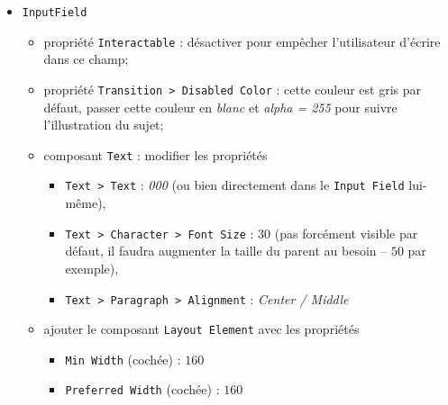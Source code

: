 \documentclass[a4paper,10pt]{article}
\newenvironment{solution}%
{\begin{tcolorbox}[breakable,colback=red!5!white,colframe=red!75!black,title=Solution]}%
{\end{tcolorbox}}
\begin{document}
\begin{solution}
\begin{itemize}
\begin{itemize}
\end{itemize}
\item \texttt{InputField}
	\begin{itemize} 	
		\item propriété \texttt{Interactable} : désactiver pour empêcher l'utilisateur d'écrire dans ce champ;
		\item propriété \texttt{Transition > Disabled Color} : cette couleur est gris par défaut, passer cette couleur en \textit{blanc} et \textit{alpha = 255} pour suivre l'illustration du sujet;
		\item composant \texttt{Text} : modifier les propriétés
		\begin{itemize} 	
			\item \texttt{Text > Text} : \textit{000} (ou bien directement dans le \texttt{Input Field} lui-même),
			\item \texttt{Text > Character > Font Size} : $30$ (pas forcément visible par défaut, il faudra augmenter la taille du parent au besoin -- $50$ par exemple),
			\item \texttt{Text > Paragraph > Alignment} : \textit{Center / Middle}
		\end{itemize}		
		\item ajouter le composant \texttt{Layout Element} avec les propriétés
		\begin{itemize} 	
			\item \texttt{Min Width} (cochée) : $160$
			\item \texttt{Preferred Width} (cochée) : $160$
		\end{itemize}		
	\end{itemize}	
\end{itemize}




\end{solution}
\end{document}
